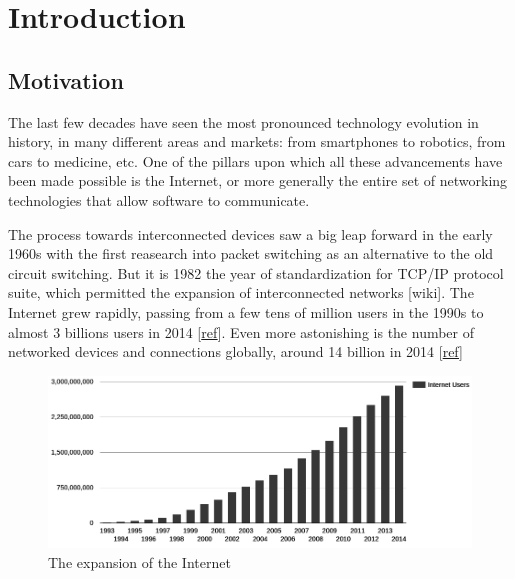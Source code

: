 \chapter{Introduction}
\label{chap:introduction}

\section{Motivation}
The last few decades have seen the most pronounced technology evolution in history, in many different areas and markets: from smartphones to robotics, from cars to medicine, etc. One of the pillars upon which all these advancements have been made possible is the Internet, or more generally the entire set of networking technologies that allow software to communicate. 


The process towards interconnected devices saw a big leap forward in the early 1960s with the first reasearch into packet switching as an alternative to the old circuit switching. But it is 1982 the year of standardization for TCP/IP protocol suite, which permitted the expansion of interconnected networks  [wiki]. The Internet grew rapidly, passing from a few tens of million users in the 1990s to almost 3 billions users in 2014 [\href{http://www.internetlivestats.com/internet-users}{ref}]. Even more astonishing is the number of networked devices and connections globally, around 14 billion in 2014 [\href{http://www.cisco.com/c/en/us/solutions/service-provider/visual-networking-index-vni/index.html#~complete-forecast}{ref}]

\begin{figure}[!htb]
\centering
\includegraphics[width=\textwidth]{images/internet_growth}
\caption{The expansion of the Internet}
\label{fig:networkscenario}
\end{figure}

